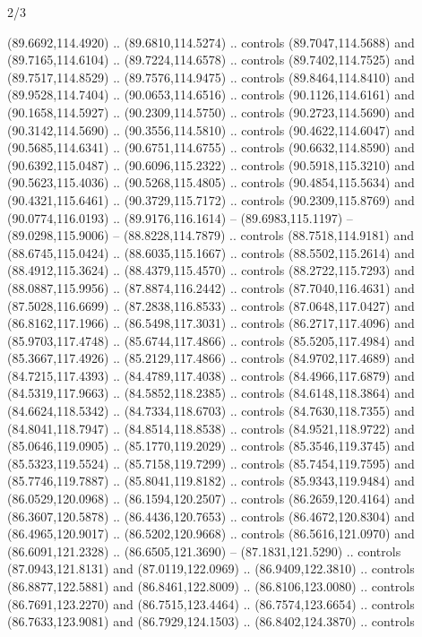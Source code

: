 \begin{flagdescription}{2/3}
\begin{scope}[shift={(0.5\flaglength,0.5)},scale=\flagwidth/320]
\begin{scope}[y=0.8pt, x=0.8pt, yscale=-1,shift={(-118.3,-146)}]
  (89.6692,114.4920) .. (89.6810,114.5274) .. controls (89.7047,114.5688) and
  (89.7165,114.6104) .. (89.7224,114.6578) .. controls (89.7402,114.7525) and
  (89.7517,114.8529) .. (89.7576,114.9475) .. controls (89.8464,114.8410) and
  (89.9528,114.7404) .. (90.0653,114.6516) .. controls (90.1126,114.6161) and
  (90.1658,114.5927) .. (90.2309,114.5750) .. controls (90.2723,114.5690) and
  (90.3142,114.5690) .. (90.3556,114.5810) .. controls (90.4622,114.6047) and
  (90.5685,114.6341) .. (90.6751,114.6755) .. controls (90.6632,114.8590) and
  (90.6392,115.0487) .. (90.6096,115.2322) .. controls (90.5918,115.3210) and
  (90.5623,115.4036) .. (90.5268,115.4805) .. controls (90.4854,115.5634) and
  (90.4321,115.6461) .. (90.3729,115.7172) .. controls (90.2309,115.8769) and
  (90.0774,116.0193) .. (89.9176,116.1614) -- (89.6983,115.1197) --
  (89.0298,115.9006) -- (88.8228,114.7879) .. controls (88.7518,114.9181) and
  (88.6745,115.0424) .. (88.6035,115.1667) .. controls (88.5502,115.2614) and
  (88.4912,115.3624) .. (88.4379,115.4570) .. controls (88.2722,115.7293) and
  (88.0887,115.9956) .. (87.8874,116.2442) .. controls (87.7040,116.4631) and
  (87.5028,116.6699) .. (87.2838,116.8533) .. controls (87.0648,117.0427) and
  (86.8162,117.1966) .. (86.5498,117.3031) .. controls (86.2717,117.4096) and
  (85.9703,117.4748) .. (85.6744,117.4866) .. controls (85.5205,117.4984) and
  (85.3667,117.4926) .. (85.2129,117.4866) .. controls (84.9702,117.4689) and
  (84.7215,117.4393) .. (84.4789,117.4038) .. controls (84.4966,117.6879) and
  (84.5319,117.9663) .. (84.5852,118.2385) .. controls (84.6148,118.3864) and
  (84.6624,118.5342) .. (84.7334,118.6703) .. controls (84.7630,118.7355) and
  (84.8041,118.7947) .. (84.8514,118.8538) .. controls (84.9521,118.9722) and
  (85.0646,119.0905) .. (85.1770,119.2029) .. controls (85.3546,119.3745) and
  (85.5323,119.5524) .. (85.7158,119.7299) .. controls (85.7454,119.7595) and
  (85.7746,119.7887) .. (85.8041,119.8182) .. controls (85.9343,119.9484) and
  (86.0529,120.0968) .. (86.1594,120.2507) .. controls (86.2659,120.4164) and
  (86.3607,120.5878) .. (86.4436,120.7653) .. controls (86.4672,120.8304) and
  (86.4965,120.9017) .. (86.5202,120.9668) .. controls (86.5616,121.0970) and
  (86.6091,121.2328) .. (86.6505,121.3690) -- (87.1831,121.5290) .. controls
  (87.0943,121.8131) and (87.0119,122.0969) .. (86.9409,122.3810) .. controls
  (86.8877,122.5881) and (86.8461,122.8009) .. (86.8106,123.0080) .. controls
  (86.7691,123.2270) and (86.7515,123.4464) .. (86.7574,123.6654) .. controls
  (86.7633,123.9081) and (86.7929,124.1503) .. (86.8402,124.3870) .. controls

\end{scope}
\end{scope}
\end{flagdescription}
